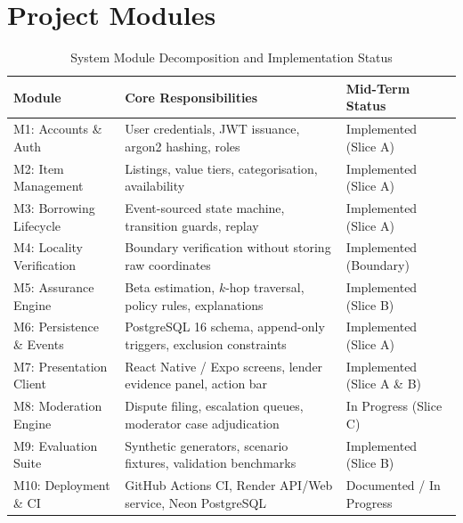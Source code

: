 \section{Project Modules}
\begin{table}[htbp]
\centering
\caption{System Module Decomposition and Implementation Status}
\label{tab:module_decomposition}
\small
\begin{tabularx}{\textwidth}{l p{7.5cm} l}
\toprule
\textbf{Module} & \textbf{Core Responsibilities} & \textbf{Mid-Term Status} \\
\midrule
M1: Accounts \& Auth & User credentials, JWT issuance, argon2 hashing, roles & Implemented (Slice A) \\
M2: Item Management & Listings, value tiers, categorisation, availability & Implemented (Slice A) \\
M3: Borrowing Lifecycle & Event-sourced state machine, transition guards, replay & Implemented (Slice A) \\
M4: Locality Verification & Boundary verification without storing raw coordinates & Implemented (Boundary) \\
M5: Assurance Engine & Beta estimation, $k$-hop traversal, policy rules, explanations & Implemented (Slice B) \\
M6: Persistence \& Events & PostgreSQL 16 schema, append-only triggers, exclusion constraints & Implemented (Slice A) \\
M7: Presentation Client & React Native / Expo screens, lender evidence panel, action bar & Implemented (Slice A \& B) \\
M8: Moderation Engine & Dispute filing, escalation queues, moderator case adjudication & In Progress (Slice C) \\
M9: Evaluation Suite & Synthetic generators, scenario fixtures, validation benchmarks & Implemented (Slice B) \\
M10: Deployment \& CI & GitHub Actions CI, Render API/Web service, Neon PostgreSQL & Documented / In Progress \\
\bottomrule
\end{tabularx}
\end{table}

